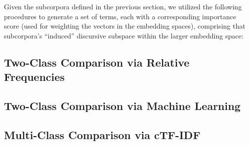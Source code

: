 \noindent Given the subcorpora defined in the previous section, we utilized the following procedures to generate a set of terms, each with a corresponding importance score (used for weighting the vectors in the embedding spaces), comprising that subcorpora's ``induced'' discursive subspace within the larger embedding space:

\subsection{Two-Class Comparison via Relative Frequencies}

\subsection{Two-Class Comparison via Machine Learning}

\subsection{Multi-Class Comparison via cTF-IDF}
